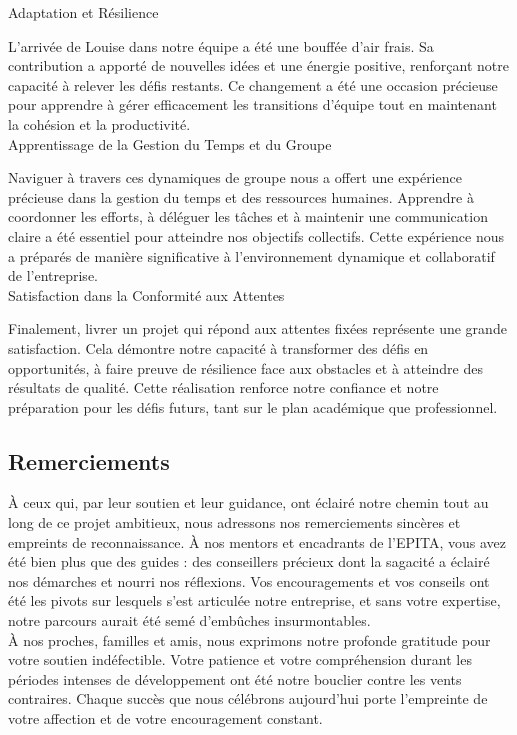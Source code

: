 Adaptation et Résilience

L'arrivée de Louise dans notre équipe a été une bouffée d'air frais. Sa contribution a apporté de nouvelles idées et une énergie positive, renforçant
notre capacité à relever les défis restants. Ce changement a été une occasion précieuse pour apprendre à gérer efficacement les transitions d'équipe
tout en maintenant la cohésion et la productivité.
\\

Apprentissage de la Gestion du Temps et du Groupe

Naviguer à travers ces dynamiques de groupe nous a offert une expérience précieuse dans la gestion du temps et des ressources humaines. Apprendre à
coordonner les efforts, à déléguer les tâches et à maintenir une communication claire a été essentiel pour atteindre nos objectifs collectifs. Cette
expérience nous a préparés de manière significative à l'environnement dynamique et collaboratif de l'entreprise.
\\

Satisfaction dans la Conformité aux Attentes

Finalement, livrer un projet qui répond aux attentes fixées représente une grande satisfaction. Cela démontre notre capacité à transformer des défis
en opportunités, à faire preuve de résilience face aux obstacles et à atteindre des résultats de qualité. Cette réalisation renforce notre confiance et
notre préparation pour les défis futurs, tant sur le plan académique que professionnel.


\subsection{Remerciements}



À ceux qui, par leur soutien et leur guidance, ont éclairé notre chemin tout au long de ce projet ambitieux, nous adressons nos remerciements sincères
et empreints de reconnaissance. À nos mentors et encadrants de l'EPITA, vous avez été bien plus que des guides : des conseillers précieux dont la sagacité
a éclairé nos démarches et nourri nos réflexions. Vos encouragements et vos conseils ont été les pivots sur lesquels s'est articulée notre entreprise, et sans votre
expertise, notre parcours aurait été semé d'embûches insurmontables.
\\

À nos proches, familles et amis, nous exprimons notre profonde gratitude pour votre soutien indéfectible. Votre patience et votre compréhension durant
les périodes intenses de développement ont été notre bouclier contre les vents contraires. Chaque succès que nous célébrons aujourd'hui porte l'empreinte
de votre affection et de votre encouragement constant.
\\

